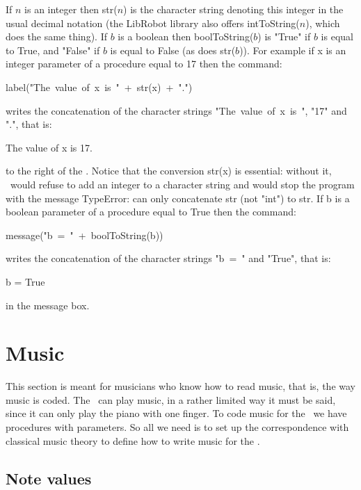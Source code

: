 If $n$ is an integer then {\idt str($n$)} is the character
string denoting this integer in the usual decimal
notation (the {\idt LibRobot} library also offers {\idt intToString($n$)},
which does the same thing). If $b$ is a boolean then {\idt boolToString($b$)} is
{\cha "True"}
if $b$ is equal to {\mcl True}, and
{\cha "False"}
if $b$ is equal to {\mcl False} (as does {\idt str($b$)}).
For example if {\idt x} is an integer parameter of a procedure equal to 17 then the
command:
\begin{center}
{\idt label(}{\cha "The\ value\ of\ x\ is\ "}\ {\idt +\ str(x)\ +}\ {\cha "."}{\idt )}
\end{center}
writes the concatenation of the character strings
{\cha "The\ value\ of\ x\ is\ "},
{\cha "17"}
and {\cha "."}, that is:
\begin{center}
{\idt The value of x is 17.}
\end{center}
to the right of the \robot. Notice that the conversion {\idt str(x)} is essential: without it,
\python\ would refuse to add an integer to a character string and would stop the program with
the message {\idt TypeError: can only concatenate str (not "int") to str}.
If {\idt b} is a boolean parameter of a procedure equal to {\mcl True} then the
command:
\begin{center}
{\idt message(}{\cha "b\ =\ "}\ {\idt +\ boolToString(b))}
\end{center}
writes the concatenation of the character strings
{\cha "b\ =\ "}
and {\cha "True"}, that is:
\begin{center}
{\idt b = True}
\end{center}
in the message box.


\section{Music}

This section is meant for musicians who know how to read music, that is, the way
music is coded. The \robot\ can play music, in a
rather limited way it must be said, since it can only play the piano with one finger. To
code music for the \robot\ we have procedures with parameters. So all we
need is to set up the correspondence with classical music theory
\cite{solfege} to define how to write music for the \robot.

\subsection{Note values}

